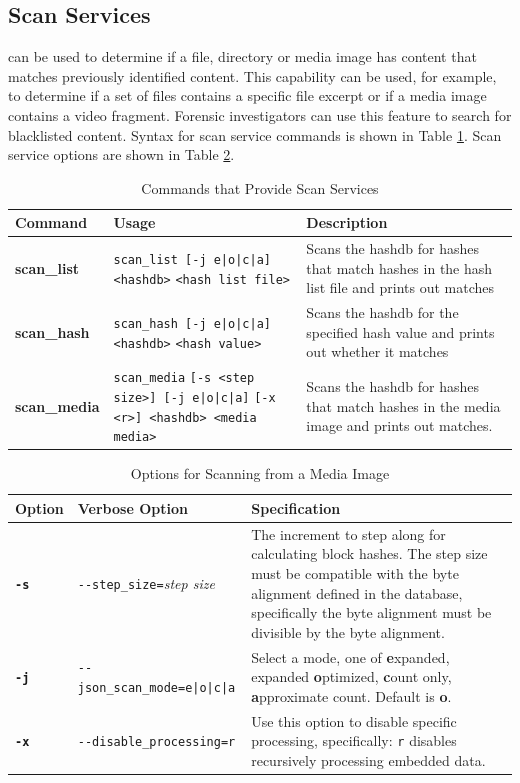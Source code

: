\documentclass[11pt,fleqn]{article} %
\begin{document}
\subsection{Scan Services}
\label{ScanServices}
\hdb can be used to determine if a file, directory or media image has content that matches previously identified content. This capability can be used, for example, to determine if a set of files contains a specific file excerpt or if a media image contains a video fragment. Forensic investigators can use this feature to search for blacklisted content.
Syntax for scan service commands is shown in Table \ref{tab:scanServices}. Scan service options are shown in Table \ref{tab:ScanOptions}.\\

\begin{table}[!ht]
\centering
\caption{Commands that Provide Scan Services}
\label{tab:scanServices}
\begin{tabular}{|p{3.5 cm}|p{6 cm}|p{4 cm}|}
\hline \hline
\textbf{Command} & \textbf{Usage} & \textbf{Description} \\
\hline
\textbf{scan\_list} & \verb+scan_list [-j e|o|c|a] <hashdb>+ \verb+<hash list file>+ & Scans the hashdb for hashes that match hashes in the hash list file and prints out matches\\
\hline
\textbf{scan\_hash} & \verb+scan_hash [-j e|o|c|a] <hashdb>+ \verb+<hash value>+ & Scans the hashdb for the specified hash value and prints out whether it matches\\
\hline
\textbf{scan\_media} & \verb+scan_media+ \verb+[-s <step size>] [-j e|o|c|a]+ \verb+[-x <r>] <hashdb> <media media>+ & Scans the hashdb for hashes that match hashes in the media image and prints out matches.\\
\hline
\end{tabular}
\end{table}

\begin{table}[!ht]
\centering
\caption{Options for Scanning from a Media Image}
\label{tab:ScanOptions}
\begin{tabular}{|p{1.5 cm}|p{8 cm}|p{4 cm}|}
\hline \hline
\textbf{Option} & \textbf{Verbose Option} & \textbf{Specification} \\
\hline
\textbf{\texttt{-s}} & \verb+--step_size=+\textit{step size} & The increment to step along for calculating block hashes. The step size must be compatible with the byte alignment defined in the database, specifically the byte alignment must be divisible by the byte alignment.\\
\hline
\textbf{\texttt{-j}} & \verb+--json_scan_mode=e|o|c|a+ & Select a mode, one of \textbf{e}xpanded, expanded \textbf{o}ptimized, \textbf{c}ount only, \textbf{a}pproximate count. Default is \textbf{o}.\\
\hline
\textbf{\texttt{-x}} & \verb+--disable_processing=r+ & Use this option to disable specific processing, specifically: \verb+r+ disables recursively processing embedded data.\\
\hline
\end{tabular}
\end{table}
\end{document}

